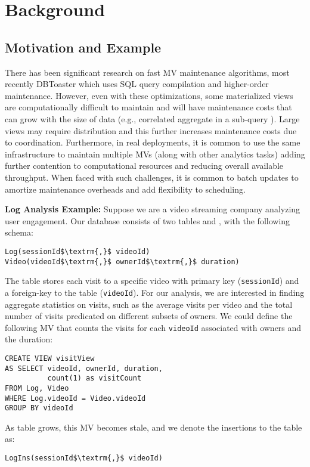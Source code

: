 \section{Background}\label{sec-background}

\subsection{Motivation and Example}\label{subsec-inc}
There has been significant research on fast MV maintenance algorithms, most recently DBToaster \cite{DBLP:journals/vldb/KochAKNNLS14} which uses SQL query compilation and higher-order maintenance.
However, even with these optimizations, some materialized views are computationally difficult to maintain and will have maintenance costs that can grow with the size of data (e.g., correlated aggregate in a sub-query ).
Large views may require distribution and this further increases maintenance costs due to coordination.
Furthermore, in real deployments, it is common to use the same infrastructure to maintain multiple MVs (along with other analytics tasks) adding further contention to computational resources and reducing overall available throughput. 
When faced with such challenges, it is common to batch updates to amortize maintenance overheads and add flexibility to scheduling.

\noindent \textbf{Log Analysis Example: } 
Suppose we are a video streaming company analyzing user engagement.
Our database consists of two tables  and , with the following schema:
\begin{lstlisting}[mathescape,basicstyle={\scriptsize}]
Log(sessionId$\textrm{,}$ videoId)
Video(videoId$\textrm{,}$ ownerId$\textrm{,}$ duration)
\end{lstlisting}
The  table stores each visit to a specific video with primary key (\texttt{sessionId}) and a foreign-key to the  table (\texttt{videoId}).
For our analysis, we are interested in finding aggregate statistics on visits, such as the average visits per video and the total number of visits predicated on different subsets of owners. 
We could define the following MV that counts the visits for each \texttt{videoId} associated with owners and the duration: 
\begin{lstlisting}[mathescape,basicstyle={\scriptsize}]
CREATE VIEW visitView
AS SELECT videoId, ownerId, duration,
          count(1) as visitCount
FROM Log, Video
WHERE Log.videoId = Video.videoId
GROUP BY videoId
\end{lstlisting}
As  table grows, this MV becomes stale, and we denote the insertions to the table as:
\begin{lstlisting}[mathescape,basicstyle={\scriptsize}]
LogIns(sessionId$\textrm{,}$ videoId)
\end{lstlisting}

